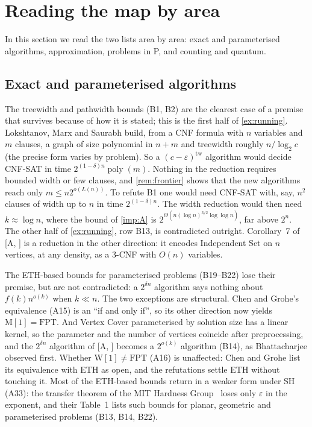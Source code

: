 \documentclass[10pt]{amsart}
\theoremstyle{plain}
\theoremstyle{definition}
\theoremstyle{remark}
\numberwithin{equation}{section}
\newcommand{\poly}{\operatorname{poly}}
\newcommand{\A}[1][]{\textup{[A\if\relax\detokenize{#1}\relax\else, #1\fi]}}
\begin{document}
\section{Reading the map by area}\label{sec:areas}

In this section we read the two lists area by area: exact and parameterised algorithms,
approximation, problems in P, and counting and quantum.

\subsection{Exact and parameterised algorithms}
The treewidth and pathwidth bounds (B1, B2) are the clearest case of a premise that survives
because of how it is stated; this is the first half of \cref{ex:running}. Lokshtanov, Marx and
Saurabh build, from a CNF formula with $n$ variables and $m$ clauses, a graph of size polynomial in
$n+m$ and treewidth roughly $n/\log_2 c$ (the precise form varies by problem). So a
$(c-\varepsilon)^{\mathrm{tw}}$ algorithm would decide CNF-SAT in time $2^{(1-\delta)n}\poly(m)$.
Nothing in the reduction requires bounded width or few clauses, and \cref{rem:frontier} shows that
the new algorithms reach only $m\le n2^{o(L(n))}$. To refute B1 one would need CNF-SAT with, say,
$n^2$ clauses of width up to $n$ in time $2^{(1-\delta)n}$. The width reduction would then need
$k\approx\log n$, where the bound of \cref{imp:A} is $2^{\Theta(n(\log n)^{3/2}\log\log n)}$, far
above $2^n$.
The other half of \cref{ex:running}, row B13, is contradicted outright. Corollary~7 of \A{} is a
reduction in the other direction: it encodes Independent Set on $n$ vertices, at any density, as a
$3$-CNF with $O(n)$ variables.

The ETH-based bounds for parameterised problems (B19--B22) lose their premise, but are not
contradicted: a $2^{\delta n}$ algorithm says nothing about $f(k)n^{o(k)}$ when $k\ll n$. The two
exceptions are structural. Chen and Grohe's equivalence (A15) is an ``if and only if'', so its
other direction now yields $\mathrm{M}[1]=\mathrm{FPT}$. And Vertex Cover parameterised by solution
size has a linear kernel, so the parameter and the number of vertices coincide after
preprocessing, and the $2^{\delta n}$ algorithm of \A{} becomes a $2^{o(k)}$ algorithm (B14), as Bhattacharjee
observed first.
Whether $\mathrm{W}[1]\ne\mathrm{FPT}$ (A16) is unaffected: Chen and Grohe list its equivalence
with ETH as open, and the refutations settle ETH without touching it. Most of the ETH-based bounds
return in a weaker form under SH (A33): the transfer theorem of the MIT Hardness
Group~\cite[Thm.~3.1]{MIT26} loses only $\varepsilon$ in the exponent, and their Table~1 lists such
bounds for planar, geometric and parameterised problems (B13, B14, B22).
\end{document}
